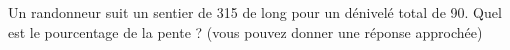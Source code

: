 
\begin{exercice}\label{exosmath-0621}

    Un randonneur suit un sentier de \unit{315}{\meter} de long pour un dénivelé total de \unit{90}{\meter}. Quel est le pourcentage de la pente ? (vous pouvez donner une réponse approchée)

\end{exercice}
